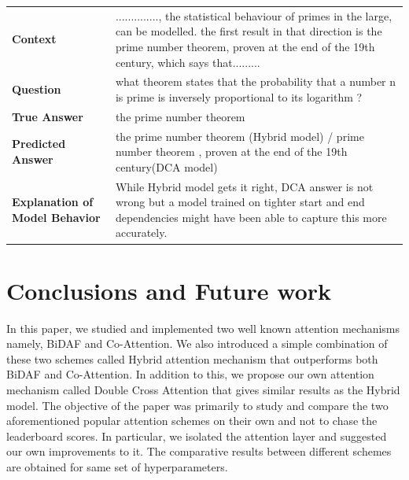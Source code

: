 \documentclass{article} %
\begin{document}
\begin{center}
\begin{table}[ht]
{\begin{tabular}{ p{4cm}  p{10cm} }
    \hline
    \bfseries Context 			  & .............., the statistical behaviour of primes in the large, can be modelled. the first result in that direction is the prime number theorem, proven at the end of the 19th century, which says that.........\\ 
    \bfseries Question    		  & what theorem states that the probability that a number n is prime is inversely proportional to its logarithm ?\\
    \bfseries True Answer   	  	  & the prime number theorem\\
    \bfseries Predicted Answer   	  & the prime number theorem (Hybrid model) / prime number theorem , proven at the end of the 19th century(DCA model)\\
    \bfseries Explanation of Model Behavior   & While Hybrid model gets it right, DCA answer is not wrong but a model trained on tighter start and end dependencies might have been able to capture this more accurately.\\
    \hline
    \end{tabular}
}
\hfill{}
\label{tb:error}
\end{table}
\end{center}


\section{Conclusions and Future work}
In this paper, we studied and implemented two well known attention mechanisms namely, BiDAF and Co-Attention. We also introduced a simple combination of these two schemes called Hybrid attention mechanism that outperforms both BiDAF and Co-Attention. In addition to this, we propose our own attention mechanism called Double Cross Attention that gives similar results as the Hybrid model. The objective of the paper was primarily to study and compare the two aforementioned popular attention schemes on their own and not to chase the leaderboard scores. In particular, we isolated the attention layer and suggested our own improvements to it. The comparative results between different schemes are obtained for same set of hyperparameters. 
\end{document}
